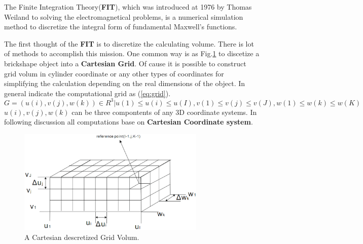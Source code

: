 
The Finite Integration Theory(\textbf{FIT}), which was introduced at 1976 by Thomas Weiland\cite{FIT_discrete_method} to solving the electromagnetical problems, is a numerical simulation method to discretize the integral form of fundamental Maxwell's functions.

The first thought of the \textbf{FIT} is to discretize the calculating volume. There is lot of methods to accomplish this mission. One common way is as Fig.\ref{fig:discretization_material} to discetize a brickshape object into a \textbf{Cartesian Grid}. Of cause it is possible to construct grid volum in cylinder coordinate or any other types of  coordinates\cite{FIT_triangular_discretization}\cite{FDTD_nonorthogonal_grids} for simplifying the calculation depending on the real dimensions of the object. In general \cite{script_FeldSim} indicate the computational grid as (\ref{eq:grid}).
\begin{equation}
G={(u(i),v(j),w(k))\in R^3|u(1)\leq u(i)\leq u(I),
													 v(1)\leq v(j)\leq v(J),
													 w(1)\leq w(k)\leq w(K)
}
\label{eq:grid}
\end{equation}
$u(i),v(j),w(k)$ can be three compontents of any 3D coordinate systems. In following discussion all computations base on \textbf{Cartesian Coordinate system}.
\begin{figure}
\includegraphics[width=0.8\textwidth]{bilder/grid_volum}
\caption{A Cartesian descretized Grid Volum.}
\label{fig:discretization_material}
\end{figure}


